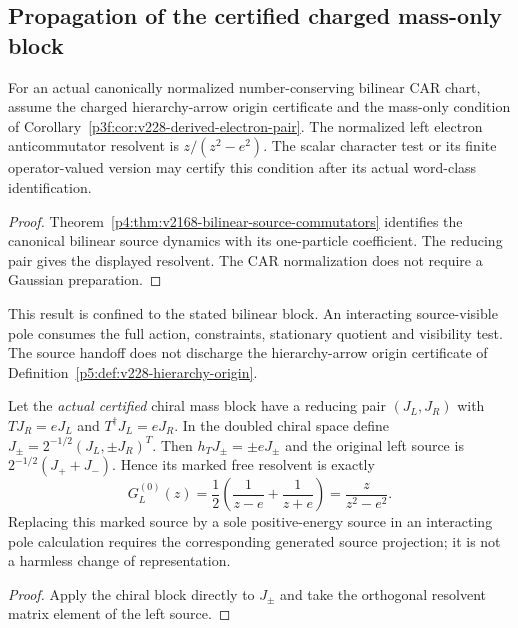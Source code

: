 \documentclass[12pt,a4paper]{article}
\begin{document}
\subsection{Propagation of the certified charged mass-only block}
\label{p4:sec:v228-charged-bilinear}
\begin{corollary}
\label{p4:cor:v228-charged-bilinear}
For an actual canonically normalized number-conserving bilinear CAR chart,
assume the charged hierarchy-arrow origin certificate and the mass-only
condition of Corollary~\ref{p3f:cor:v228-derived-electron-pair}.
The normalized left electron anticommutator resolvent is $z/(z^2-e^2)$.
The scalar character test or its finite operator-valued version may certify
this condition after its actual word-class identification.
\end{corollary}
\begin{proof}
Theorem~\ref{p4:thm:v2168-bilinear-source-commutators} identifies the
canonical bilinear source dynamics with its one-particle coefficient.
The reducing pair gives the displayed resolvent. The CAR normalization
does not require a Gaussian preparation.
\end{proof}
This result is confined to the stated bilinear block. An interacting
source-visible pole consumes the full action, constraints, stationary
quotient and visibility test. The source handoff does not discharge the
hierarchy-arrow origin certificate of
Definition~\ref{p5:def:v228-hierarchy-origin}.


\begin{proposition}
\label{p4b:prop:v240-protected-chiral-source-splitting}
Let the \emph{actual certified} chiral mass block have a reducing
pair $(J_L,J_R)$ with $TJ_R=eJ_L$ and $T^\dagger J_L=eJ_R$.
In the doubled chiral space define
$J_\pm=2^{-1/2}(J_L,\pm J_R)^T$.
Then $h_TJ_\pm=\pm eJ_\pm$ and the original left source is
$2^{-1/2}(J_++J_-)$. Hence its marked free resolvent is exactly
\[
 \boxed{G_L^{(0)}(z)=\frac12\left(\frac1{z-e}
               +\frac1{z+e}\right)=\frac{z}{z^2-e^2}.}
\]
Replacing this marked source by a sole positive-energy source in
an interacting pole calculation requires the corresponding generated
source projection; it is not a harmless change of representation.
\end{proposition}
\begin{proof}
Apply the chiral block directly to $J_\pm$ and take the
orthogonal resolvent matrix element of the left source.
\end{proof}
\end{document}
